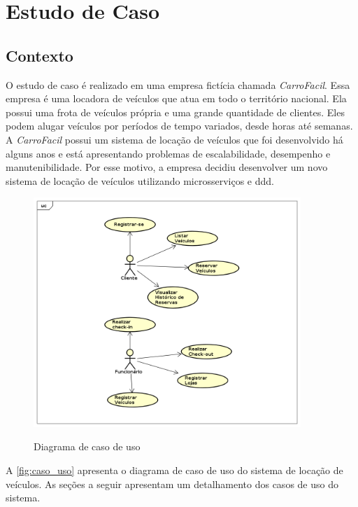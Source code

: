 \section{Estudo de Caso}

\subsection{Contexto}
\label{section:contexto}
O estudo de caso é realizado em uma empresa fictícia chamada \emph{CarroFacil}. Essa empresa é uma locadora de veículos que atua em todo o território nacional. Ela possui uma frota de veículos própria e uma grande quantidade de clientes. Eles podem alugar veículos por períodos de tempo variados, desde horas até semanas. A \emph{CarroFacil} possui um sistema de locação de veículos que foi desenvolvido há alguns anos e está apresentando problemas de escalabilidade, desempenho e manutenibilidade. Por esse motivo, a empresa decidiu desenvolver um novo sistema de locação de veículos utilizando microsserviços e \acrshort{ddd}.

\begin{figure}[!h]
    \centering
    \caption{Diagrama de caso de uso}
    \includegraphics[width=0.9\textwidth]{media/diagrama_usecase.png}
    \label{fig:caso_uso}
\end{figure}

A \autoref{fig:caso_uso} apresenta o diagrama de caso de uso do sistema de locação de veículos. As seções a seguir apresentam um detalhamento dos casos de uso do sistema.

